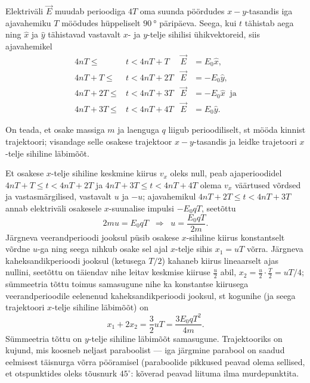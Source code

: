 \setAuthor{}

Elektriväli $\vec E$ muudab perioodiga $4T$ oma suunda pöördudes $x-y$-tasandis iga 
ajavahemiku $T$ möödudes hüppeliselt $\SI{90}\degree$ päripäeva. Seega, kui $t$ tähistab aega 
ning $\hat x$ ja $\hat y$ tähistavad vastavalt $x$- ja $y$-telje sihilisi ühikvektoreid,  siis ajavahemikel
\begin{align*}
4nT\le &t < 4nT+T \;\; & \vec E&=E_0\hat x,\\
4nT+T\le &t < 4nT+2T   & \vec E&=-E_0\hat y,\\
4nT+2T\le &t < 4nT+3T  & \vec E&=-E_0\hat x \;\;\mbox{ja}\\
4nT+3T\le &t < 4nT+4T & \vec E&=E_0\hat y.
\end{align*}

On teada, et osake massiga $m$ ja laenguga $q$ liigub perioodiliselt, st mööda kinnist trajektoori; visandage selle osakese 
trajektoor $x-y$-tasandis ja leidke trajetoori $x$-telje sihiline läbimõõt. 

\hint

\solu
Et osakese $x$-telje sihiline keskmine kiirus $v_x$ oleks null, peab ajaperioodidel $4nT+T\le t < 4nT+2T$ ja  $4nT+3T\le t < 4nT+4T$ olema $v_x$ väärtused võrdsed ja vastasmärgilised, vastavalt $u$ ja $-u$; ajavahemikul $4nT+2T\le t < 4nT+3T$ annab elektriväli osakesele $x$-suunalise impulsi $-E_0qT$, seetõttu
$$2mu=E_0qT \;\;\Rightarrow\;\; u=\frac{E_0qT}{2m}.$$
Järgneva veerandperioodi jooksul püsib osakese $x$-sihiline kiirus konstantselt võrdne $u$-ga ning seega nihkub osake sel ajal $x$-telje sihis $x_1=uT$ võrra. Järgneva kaheksandikperioodi jooksul (ketusega $T/2$) kahaneb kiirus lineaarselt ajas nullini, seetõttu on täiendav nihe leitav keskmise kiiruse $\frac u2$ abil, $x_2=\frac u2\cdot \frac T2=uT/4$; sümmeetria tõttu toimus samasugune nihe ka konstantse kiirusega veerandperioodile eelenenud kaheksandikperioodi jooksul, st kogunihe (ja seega trajektoori $x$-telje sihiline läbimõõt) on $$x_1+2x_2=\frac32 uT=\frac{3E_0qT^2}{4m}.$$
Sümmeetria tõttu on $y$-telje sihiline läbimõõt samasugune. Trajektooriks on kujund, mis koosneb neljast paraboolist --- iga järgmine parabool on saadud eelmisest täisnurga võrra pööramisel (paraboolide pikkused peavad olema sellised, et otspunktides oleks tõusnurk $45^\circ$: kõverad peavad liituma ilma murdepunktita.

